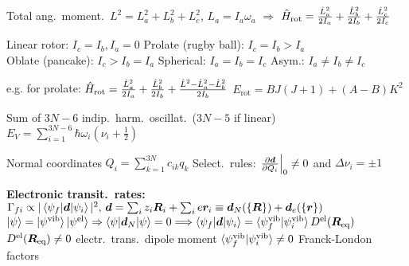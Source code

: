 \begin{squishlist}
    \item Total ang.\ moment.\ $L^2 = L_a^2 + L_b^2 + L_c^2$, \quad $L_a = I_a \omega_a$ \quad $\Rightarrow$  \quad$\ham_{\text{rot}} = \frac{\hat{L}_a^2}{2I_a} + \frac{\hat{L}_b^2}{2I_b} + \frac{\hat{L}_c^2}{2I_c}$
    \item Linear rotor: $I_c = I_b, I_a=0$ \quad Prolate (rugby ball): $I_c = I_b > I_a$  \\
    Oblate (pancake): $I_c > I_b = I_a$ \quad Spherical: $I_a = I_b=I_c$ \quad Asym.:  $I_a \neq I_b \neq I_c$
    \item e.g. for prolate: $\ham_{\text{rot}} = \frac{\hat{L}_a^2}{2I_a} + \frac{\hat{L}_b^2}{2I_b} + \frac{\hat{L}^2 - \hat{L}_a^2 - \hat{L}_b^2}{2I_b} $ \quad $E_{\text{rot}} = B J(J+1) + (A - B)K^2$
\end{squishlist}

\begin{squishlist}
    \item Sum of $3N-6$ indip.\ harm.\ oscillat.\ ($3N-5$ if linear) \quad $E_V = \sum_{i=1}^{3N-6} \hbar \omega_i (\nu_i + \frac{1}{2})$
    \item Normal coordinates $Q_i = \sum_{k=1}^{3N} c_{ik} q_k$ \squishsep Select.\ rules: $\left. \D{Q_i}{\vec{d}}\right|_0 \neq 0 $ and $\Delta \nu_i = \pm 1$
    \item \textbf{Electronic transit.\ rates:} $\Gamma_{fi} \propto |\braket{\psi_f | \vec{d}|\psi_i}|^2, \, \vec{d} = \sum_i z_i \vR_i + \sum_i e \vr_i \equiv \vec{d}_N(\{\vR\}) + \vec{d}_e(\{\vr\}) $\\
    $\kpsi = \ket{\psi^{\text{vib}}} \ket{\psi^{\text{el}}} \Rightarrow \braket{\psi|\vec{d}_N|\psi} = 0 \Longrightarrow \braket{\psi_f | \vec{d}|\psi_i} = \braket{\psi_f^{\text{vib}}|\psi_i^{\text{vib}}} D^{\text{el}}(\vR_{\text{eq}})$ \\
    $D^{\text{el}}(\vR_{\text{eq}}) \neq 0$ electr.\ trans.\ dipole moment \quad $\braket{\psi_f^{\text{vib}}|\psi_i^{\text{vib}}} \neq 0$ Franck-London factors
\end{squishlist}


